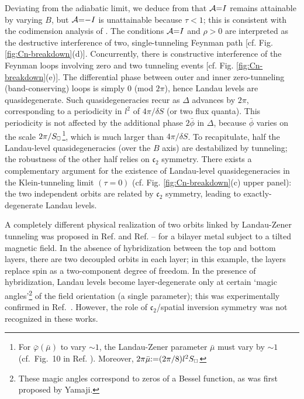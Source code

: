 \documentclass[aps, showpacs, twocolumn, notitlepage, superscriptaddress]{revtex4-1}
\begin{document}
Deviating from the adiabatic limit, we deduce from  that ${\cal A}{=}I$ remains attainable by varying $B$, but ${\cal A}{=}{-}I$ is unattainable because $\tau{<}1$; this is consistent with the codimension analysis of . The conditions ${\cal A}{=}I$ and $\rho{>}0$ are interpreted as the destructive interference of  two, single-tunneling Feynman path [cf. Fig. \ref{fig:Cn-breakdown}(d)]. Concurrently, there is constructive interference of the Feynman loops involving zero and two tunneling events [cf. Fig. \ref{fig:Cn-breakdown}(e)]. The differential phase between outer and inner zero-tunneling (band-conserving) loops is simply 0 (mod $2\pi$), hence Landau levels are quasidegenerate. Such quasidegeneracies recur as $\Delta$ advances by $2\pi$, corresponding to a periodicity in $l^2$ of $4\pi/\delta S$ (or two flux quanta). This periodicity is not affected by the additional phase $2\bar{\phi}$ in $\Delta$, because $\bar{\phi}$ varies on the scale  $2\pi/S_{\scriptscriptstyle{\square}}$\footnote{For $\bar{\varphi}(\bar{\mu})$ to vary $\sim 1$, the Landau-Zener parameter $\bar{\mu}$ must vary by $\sim 1$ (cf.\  Fig.\ 10 in Ref. ). Moreover, $2\pi\bar{\mu}{:}{=} (2\pi/8) l^2S_{\scriptscriptstyle{\square}}$\cite{AALG}}, which is much larger than $4\pi/\delta S$. To recapitulate, half the Landau-level quasidegeneracies (over the $B$ axis) are destabilized  by tunneling; the robustness of the other half relies on $\mathfrak{c}_2$ symmetry. There exists a complementary argument for the existence of Landau-level quasidegeneracies in the Klein-tunneling limit $(\tau{=}0)$ (cf. Fig. \ref{fig:Cn-breakdown}(c) upper panel): the two independent orbits are related by $\mathfrak{c}_2$ symmetry, leading to exactly-degenerate Landau levels.  

A completely different physical realization of two orbits linked by Landau-Zener tunneling was proposed in Ref.  and Ref.  -- for a bilayer {metal} subject to a tilted magnetic field. {In the absence of hybridization between the top and bottom layers, there are two decoupled orbits in each layer; in this example, the layers replace spin as a two-component degree of freedom. In the presence of hybridization,   Landau levels become layer-degenerate} only  at certain `magic angles'\footnote{These magic angles correspond to zeros of a Bessel function, as was first proposed by Yamaji.\cite{yamaji_angle_1989}} of the field orientation (a single parameter); this was experimentally confirmed in Ref.\ . However, the role of $\mathfrak{c}_2${/spatial inversion} symmetry was not recognized in these works. 
\end{document}

